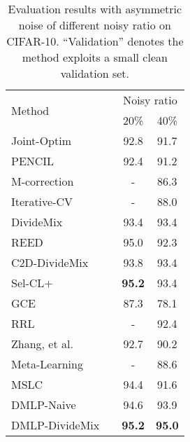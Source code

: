 \documentclass[10pt,twocolumn,letterpaper]{article}
\newcommand{\red}[1]{{#1}}
\begin{document}
\begin{table}
\footnotesize
    \caption{Evaluation results with asymmetric noise of different noisy ratio on CIFAR-10. \red{``Validation'' denotes the method exploits a small clean validation set.}}
    \vspace{-1em}
    \centering
    \begin{tabular}{p{3.2cm} |c |cc}
        \toprule
        \multirow{2}{*}{Method}  & & \multicolumn{2}{c}{Noisy ratio} \\ \cmidrule{3-4} 
        & \cellcolor{white}\multirow{-2}{*}{\red{Validation}} & 20\% & 40\% \\ \midrule
        Joint-Optim\cite{tanaka2018joint}       &   \red{{\XSolidBrush}}    & 92.8    & 91.7 \\ 
        
        PENCIL~\cite{yi2019probabilistic}       &    \red{{\XSolidBrush}}     & 92.4   & 91.2 \\ 
M-correction~\cite{arazo2019unsupervised}   &  \red{{\XSolidBrush}}   &  -      & 86.3 \\ 
        Iterative-CV~\cite{chen2019understanding}    &  \red{{\XSolidBrush}}  &  -      & 88.0 \\ 
        DivideMix~\cite{li2020dividemix}  & \red{{\XSolidBrush}}  & 93.4    & 93.4 \\ 
        REED ~\cite{zhang2020decoupling}       &    \red{{\XSolidBrush}}      & {95.0}    & {92.3}    \\
        C2D-DivideMix ~\cite{zheltonozhskii2022contrast}     &       \red{{\XSolidBrush}}     &{93.8}    & {93.4}    \\
        Sel-CL+ ~\cite{li2022selective}       &      \red{{\XSolidBrush}}    & \textbf{95.2}    & {93.4}    \\
        GCE ~\cite{ghosh2021contrastive}      &      \red{{\XSolidBrush}}     & {87.3}    & {78.1}    \\
        RRL ~\cite{li2021learning}           &   \red{{\XSolidBrush}}   & -    & {92.4}    \\ 
        \midrule
        Zhang, et al.~\cite{zhang2020distilling}   &   \red{{\CheckmarkBold}}    & 92.7    & 90.2 \\
        Meta-Learning~\cite{MLNT}                &    \red{{\CheckmarkBold}}     &  -      & 88.6 \\ 
        MSLC ~\cite{AAAI-2021-meta} & \red{{\CheckmarkBold}}  &  94.4       & 91.6\\ 
        \midrule
        DMLP-Naive                      &          \red{{\CheckmarkBold}}            & 94.6    &93.9    \\
        DMLP-DivideMix                      &          \red{{\CheckmarkBold}}            & \textbf{95.2}    & \textbf{95.0}    \\
        \bottomrule
    \end{tabular}
    \label{tab:cifar10asy}
    \end{table}
    
\end{document}
